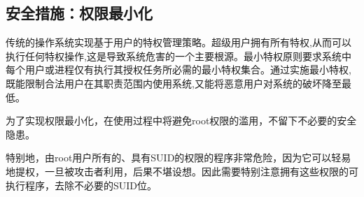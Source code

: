 \documentclass[UTF8]{ctexart}
\begin{document}
\subsection{安全措施：权限最小化}

传统的操作系统实现基于用户的特权管理策略。超级用户拥有所有特权,从而可以执行任何特权操作,这是导致系统危害的一个主要根源。最小特权原则要求系统中每个用户或进程仅有执行其授权任务所必需的最小特权集合。通过实施最小特权,既能限制合法用户在其职责范围内使用系统,又能将恶意用户对系统的破坏降至最低。\cite{谢欣伟2008操作系统用户特权最小化的研究与实现}

为了实现权限最小化，在使用过程中将避免root权限的滥用，不留下不必要的安全隐患。

特别地，由root用户所有的、具有SUID的权限的程序非常危险，因为它可以轻易地提权，一旦被攻击者利用，后果不堪设想。因此需要特别注意拥有这些权限的可执行程序，去除不必要的SUID位。\cite{牛铁2011超级计算集群的安全防护}



\end{document}
